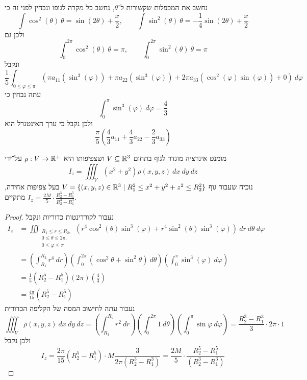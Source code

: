 נחשב את המכפלות שקשורות ל־$\theta$, נחשב כל מקרה לגופו ונבחין לפני זה כי
\[
	\int \cos^2(\theta)\ \theta = \sin(2\theta) + \frac{x}{2},
	\qquad
	\int \sin^2(\theta)\ \theta = -\frac{1}{4} \sin(2\theta) + \frac{x}{2}
\]
ולכן גם
\[
	\int_0^{2\pi} \cos^2(\theta)\ \theta = \pi,
	\qquad
	\int_0^{2\pi} \sin^2(\theta)\ \theta = \pi
\]
ונקבל
\[
	\frac{1}{5} \int_{0 \le \varphi \le \pi} (\pi a_{11} (\sin^3(\varphi)) + \pi a_{22} (\sin^3(\varphi)) + 2\pi a_{33} (\cos^2(\varphi) \sin(\varphi)) + 0)\ d\varphi
\]
עתה נבחין כי
\[
	\int_0^\pi \sin^3(\varphi)\ d\varphi = \frac{4}{3}
\]
ולכן נקבל כי ערך האינטגרל הוא
\[
	\frac{\pi}{5} (\frac{4}{3} a_{11} + \frac{4}{3} a_{22} - \frac{2}{3} a_{33})
\]

\Question{}
מומנט אינרציה מוגדר לגוף בתחום $V \subseteq \mathbb{R}^3$ ושצפיפותו היא $\rho : V \to \mathbb{R}^+$ על־ידי
\[
	I_z = \iiint_V (x^2 + y^2) \rho(x, y, z)\ dx\ dy\ dz
\]
נוכיח שעבור גוף $V = \{ (x, y, z) \in \mathbb{R}^3 \mid R_1^2 \le x^2 + y^2 + z^2 \le R_2^2 \}$ בעל צפיפות אחידה, מתקיים $I_z = \frac{2M}{5} \cdot \frac{R_2^5 - R_1^5}{R_2^3 - R_1^3}$.
\begin{proof}
	נעבור לקורדינטות כדוריות ונקבל
	\begin{align*}
		I_z & = \iiint_{\substack{R_1 \le r \le R_2, \\ 0 \le \theta \le 2\pi, \\ 0 \le \varphi \le \pi}} (r^4 \cos^2(\theta)\sin^3(\varphi) + r^4 \sin^2(\theta) \sin^3(\varphi))\ dr\ d\theta\ d\varphi \\
			& = \left( \int_{R_1}^{R_2} r^4\ dr \right) \left( \int_0^{2\pi} (\cos^2 \theta + \sin^2 \theta)\ d\theta \right) \left( \int_0^\pi \sin^3(\varphi)\ d\varphi \right) \\
			& = \frac{1}{5} \left( R_2^5 - R_1^5 \right) \left( 2\pi \right) \left( \frac{4}{3} \right) \\
			& = \frac{4 \pi}{15} \left( R_2^5 - R_1^5 \right)
	\end{align*}
	נעבור עתה לחישוב המסה של הקליפה הכדורית
	\[
		\iiint_V \rho(x, y, z)\ dx\ dy\ dz
		= \left( \int_{R_1}^{R_2} r^2\ dr \right) \left( \int_0^{2\pi} 1\ d\theta \right) \left( \int_0^\pi \sin \varphi\ d\varphi \right)
		= \frac{R_2^3 - R_1^3}{3} \cdot 2\pi \cdot 1
	\]
	ולכן נקבל
	\[
		I_z
		= \frac{2 \pi}{15} \left( R_2^5 - R_1^5 \right) \cdot M \frac{3}{2\pi(R_2^3 - R_1^3)}
		= \frac{2M}{5} \cdot \frac{R_2^5 - R_1^5}{(R_2^3 - R_1^3)}
	\]
\end{proof}


